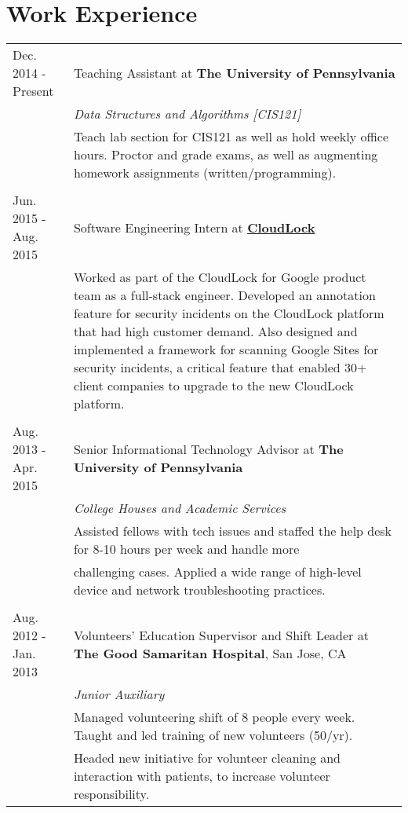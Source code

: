 \documentclass{resume}[10pt, a4paper]
\begin{document}
\section{Work Experience}
\begin{tabular}{p{3cm} | p{14cm}}
    Dec. 2014 - Present & Teaching Assistant at \textbf{The University of Pennsylvania}\\
                        & \textit{Data Structures and Algorithms [CIS121]}\\
                        & Teach lab section for CIS121 as well as hold weekly office hours. Proctor and grade exams, as well as augmenting homework assignments (written/programming).\\\\
    Jun. 2015 - Aug. 2015&Software Engineering Intern at \textbf{\href{http://cloudlock.com}{CloudLock}}\\
                         & Worked as part of the CloudLock for Google product team as a full-stack engineer. Developed an annotation feature for security incidents on the CloudLock platform that had high customer demand. Also designed and implemented a framework for scanning Google Sites for security incidents, a critical feature that enabled 30+ client companies to upgrade to the new CloudLock platform.\\\\
    Aug. 2013 -Apr. 2015& Senior Informational Technology Advisor at \textbf{The University of Pennsylvania}\\
                        & \textit{College Houses and Academic Services}\\
                        & Assisted fellows with tech issues and staffed the help desk for 8-10 hours per week and handle more\\ 
                        &challenging cases. Applied a wide range of high-level device and network troubleshooting practices.\\
    \\
  Aug. 2012 - Jan. 2013 & Volunteers' Education Supervisor and Shift Leader at \textbf{The Good Samaritan Hospital}, San Jose, CA\\
                        &\textit{Junior Auxiliary}\\
                        &Managed volunteering shift of 8 people every week. Taught and led training of new volunteers (50/yr).\\
                        &Headed new initiative for volunteer cleaning and interaction with patients, to increase volunteer responsibility.\\
\end{tabular}
\end{document}
